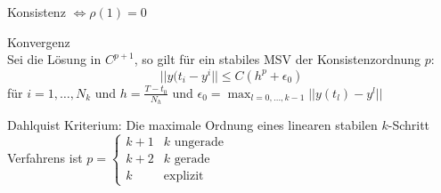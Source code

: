 \begin{remark}
	Konsistenz $\Leftrightarrow \rho(1)=0$
\end{remark}

\begin{theorem}
	Konvergenz
	\\
	Sei die Lösung in $C^{p+1}$, so gilt für ein stabiles MSV der Konsistenzordnung $p$:
	$$||y(t_{i}-y^{i}||\le C(h^{p}+\epsilon_{0})$$
	für $i=1,\ldots,N_{k}$ und $h=\frac{T-t_{0}}{N_{h}}$ und $\epsilon_{0}=\max_{l=0,\ldots,k-1}||y(t_{l})-y^{l}||$
\end{theorem}

\begin{remark}
 Dahlquist Kriterium: Die maximale Ordnung eines linearen stabilen $k$-Schritt Verfahrens ist 
 $p=\begin{cases}
 	k+1&k \text{ ungerade}\\
 	k+2&k \text{ gerade}\\
 	k&\text{explizit}
 \end{cases}$
\end{remark}